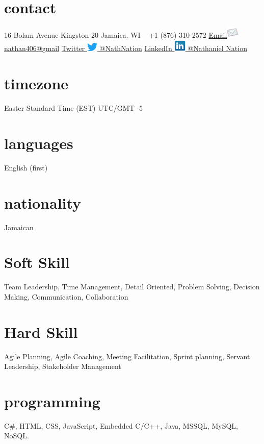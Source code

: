 \documentclass[]{friggeri-cvRS}
\begin{document}
\begin{aside}
  \section{contact}
   16 Bolam Avenue
   Kingston 20
    Jamaica. WI
    ~
    +1 (876) 310-2572
    \href{mailto:nathan406@gmail.com}{Email\includegraphics[height=16pt]{images/email.png}
    nathan406@gmail}
    \href{https://twitter.com/NathNation}{Twitter \includegraphics[height=12pt]{images/twitter.png}
    @NathNation}
    \href {https://www.linkedin.com/in/nathaniel-nation-5645642a/}{LinkedIn  \includegraphics[height=16pt]{images/linkedin.png}
    @Nathaniel Nation}
    \section{timezone}
    Easter Standard Time (EST)
    UTC/GMT -5
    \section{languages}
    English (first)
    \section{nationality}
    Jamaican
    \section{Soft Skill}
     Team Leadership, Time Management, Detail Oriented, Problem Solving, Decision Making, Communication, Collaboration
    \section{Hard Skill}
     Agile Planning, Agile Coaching, Meeting Facilitation, Sprint planning, Servant Leadership, Stakeholder Management
    \section{programming}
     C\#, HTML, CSS, JavaScript, Embedded C/C++, Java, MSSQL, MySQL, NoSQL.
\end{aside}
\end{document}
